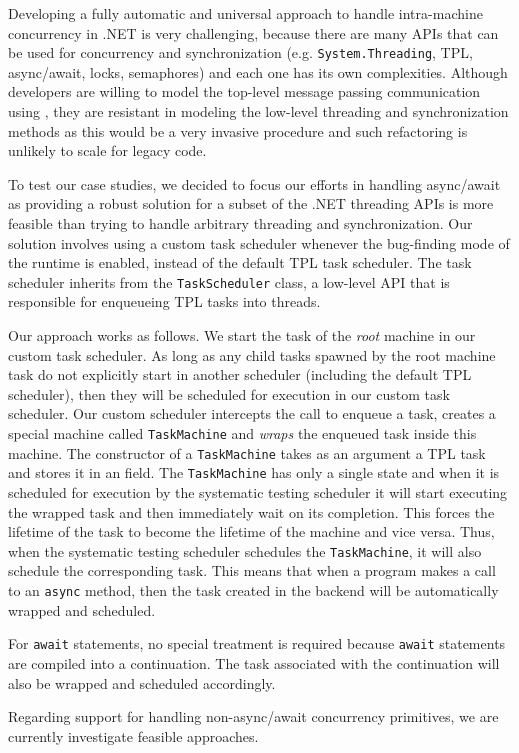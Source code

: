 Developing a fully automatic and universal approach to handle intra-machine concurrency in .NET is very challenging, because there are many APIs that can be used for concurrency and synchronization (e.g. \texttt{System.Threading}, TPL, async/await, locks, semaphores) and each one has its own complexities. Although developers are willing to model the top-level message passing communication using \psharp, they are resistant in modeling the low-level threading and synchronization methods as this would be a very invasive procedure and such refactoring is unlikely to scale for legacy code.

To test our case studies, we decided to focus our efforts in handling async/await as providing a robust solution for a subset of the .NET threading APIs is more feasible than trying to handle arbitrary threading and synchronization. Our solution involves using a custom task scheduler whenever the bug-finding mode of the \psharp runtime is enabled, instead of the default TPL task scheduler. The \psharp task scheduler inherits from the \texttt{TaskScheduler} class, a low-level API that is responsible for enqueueing TPL tasks into threads.

Our approach works as follows. We start the task of the \emph{root} \psharp machine in our custom task scheduler. As long as any child tasks spawned by the root machine task do not explicitly start in another scheduler (including the default TPL scheduler), then they will be scheduled for execution in our custom task scheduler. Our custom scheduler intercepts the call to enqueue a task, creates a special machine called \texttt{TaskMachine} and \emph{wraps} the enqueued task inside this machine. The constructor of a \texttt{TaskMachine} takes as an argument a TPL task and stores it in an field. The \texttt{TaskMachine} has only a single state and when it is scheduled for execution by the \psharp systematic testing scheduler it will start executing the wrapped task and then immediately wait on its completion. This forces the lifetime of the task to become the lifetime of the machine and vice versa. Thus, when the \psharp systematic testing scheduler schedules the \texttt{TaskMachine}, it will also schedule the corresponding task. This means that when a \psharp program makes a call to an \texttt{async} method, then the task created in the backend will be automatically wrapped and scheduled.

For \texttt{await} statements, no special treatment is required because \texttt{await} statements are compiled into a continuation. The task associated with the continuation will also be wrapped and scheduled accordingly.

Regarding support for handling non-async/await concurrency primitives, we are currently investigate feasible approaches.
